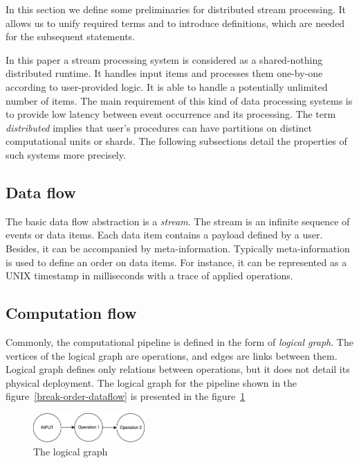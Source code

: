 
\label {fs-stream}

In this section we define some preliminaries for distributed stream processing. It allows us to unify required terms and to introduce definitions, which are needed for the subsequent statements.

In this paper a stream processing system is considered as a shared-nothing distributed runtime. It handles input items and processes them one-by-one according to user-provided logic. It is able to handle a potentially unlimited number of items. The main requirement of this kind of data processing systems is to provide low latency between event occurrence and its processing. The term {\em distributed} implies that user's procedures can have partitions on distinct computational units or shards. The following subsections detail the properties of such systems more precisely.  

\subsection{Data flow}
The basic data flow abstraction is a {\it stream}. The stream is an infinite sequence of events or data items. Each data item contains a payload defined by a user. Besides, it can be accompanied  by meta-information. Typically  meta-information is used to define an order on data items. For instance, it can be represented as a UNIX timestamp in milliseconds with a trace of applied operations.

\subsection{Computation flow}
Commonly, the computational pipeline is defined in the form of {\it logical graph}. The vertices of the logical graph are operations, and edges are links between them. Logical graph defines only relations between operations, but it does not detail its physical deployment. The logical graph for the pipeline shown in the figure~\ref{break-order-dataflow} is presented in the figure~\ref{break-order-dataflow-logical}

\begin{figure}[htbp]
  \centering
  \includegraphics[width=0.38\textwidth]{pics/break_order_pipeline_logical}
  \caption{The logical graph}
  \label {break-order-dataflow-logical}
\end{figure}

